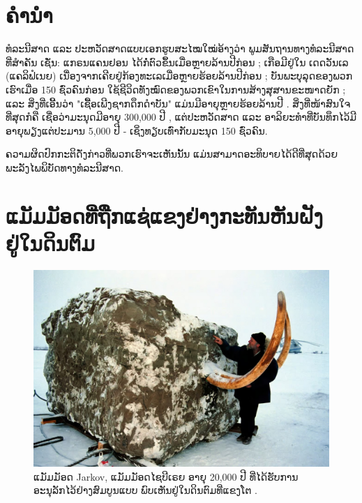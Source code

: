 \documentclass[10pt,twocolumn,letterpaper]{article}
\begin{document}
\section{ຄຳນຳ}

ທໍລະນີສາດ ແລະ ປະຫວັດສາດແບບເອກຮູບສະໄໝໃໝ່ອ້າງວ່າ ພູມສັນຖານທາງທໍລະນີສາດທີ່ສຳຄັນ ເຊັ່ນ: ແກຣນແຄນຢອນ ໄດ້ກໍ່ຕົວຂຶ້ນເມື່ອຫຼາຍລ້ານປີກ່ອນ \cite{143}; ເກືອມີຢູ່ໃນ ເດດວັນເລ (ແຄລິຟໍເນຍ) ເນື່ອງຈາກເຄີຍຢູ່ກ້ອງທະເລເມື່ອຫຼາຍຮ້ອຍລ້ານປີກ່ອນ \cite{144}; ບັນພະບຸລຸດຂອງພວກເຮົາເມື່ອ 150 ຊົ່ວຄົນກ່ອນ ໃຊ້ຊີວິດທັງໝົດຂອງພວກເຂົາໃນການສ້າງສຸສານຂະໜາດຍັກ \cite{29,70}; ແລະ ສິ່ງທີ່ເອີ້ນວ່າ "ເຊື້ອເພີງຊາກດຶກດຳບັນ" ແມ່ນມີອາຍຸຫຼາຍຮ້ອຍລ້ານປີ \cite{104}. ສິ່ງທີ່ໜ້າສົນໃຈທີ່ສຸດກໍຄື ເຊື່ອວ່າມະນຸດມີອາຍຸ 300,000 ປີ \cite{145}, ແຕ່ປະຫວັດສາດ ແລະ ອາລິຍະທຳທີ່ບັນທຶກໄວ້ມີອາຍຸພຽງແຕ່ປະມານ 5,000 ປີ - ເຊິ່ງທຽບເທົ່າກັບມະນຸດ 150 ຊົ່ວຄົນ.

ຄວາມຜິດປົກກະຕິດັ່ງກ່າວທີ່ພວກເຮົາຈະເຫັນນັ້ນ ແມ່ນສາມາດອະທິບາຍໄດ້ດີທີ່ສຸດດ້ວຍພະລັງໄພພິບັດທາງທໍລະນີສາດ.

\section{ແມັມມັອດທີ່ຖືກແຊ່ແຂງຢ່າງກະທັນຫັນຝັງຢູ່ໃນດິນຕົມ}

\begin{figure}[b]
\begin{center}
   \includegraphics[width=1\linewidth]{jarkov-mammoth.jpg}
\end{center}
   \caption{ແມັມມັອດ Jarkov, ແມັມມັອດໄຊບີເຣຍ ອາຍຸ 20,000 ປີ ທີ່ໄດ້ຮັບການອະນຸລັກໄວ້ຢ່າງສົມບູນແບບ ພົບເຫັນຢູ່ໃນດິນຕົມທີ່ແຂງໂຕ \cite{51}.}
\label{fig:1}
\label{fig:onecol}
\end{figure}
\end{document}
